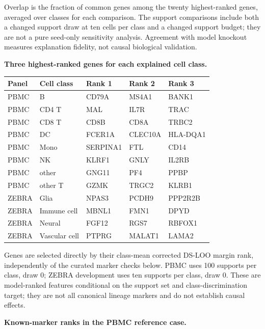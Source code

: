 Overlap is the fraction of common genes among the twenty highest-ranked genes, averaged over classes for each comparison. The support comparisons include both a changed support draw at ten cells per class and a changed support budget; they are not a pure seed-only sensitivity analysis. Agreement with model knockout measures explanation fidelity, not causal biological validation.\par\medskip\noindent\textbf{Three highest-ranked genes for each explained cell class.}\par
\nopagebreak[4]\par\noindent\begin{tabular}{@{}>{\raggedright\arraybackslash}p{2.2cm}>{\raggedright\arraybackslash}p{3.65cm}>{\raggedright\arraybackslash}p{3.0cm}>{\raggedright\arraybackslash}p{3.0cm}>{\raggedright\arraybackslash}p{3.0cm}@{}}
\toprule
Panel & Cell class & Rank 1 & Rank 2 & Rank 3 \\
\midrule
PBMC & B & CD79A & MS4A1 & BANK1 \\
PBMC & CD4 T & MAL & IL7R & TRAC \\
PBMC & CD8 T & CD8B & CD8A & TRBC2 \\
PBMC & DC & FCER1A & CLEC10A & HLA-DQA1 \\
PBMC & Mono & SERPINA1 & FTL & CD14 \\
PBMC & NK & KLRF1 & GNLY & IL2RB \\
PBMC & other & GNG11 & PF4 & PPBP \\
PBMC & other T & GZMK & TRGC2 & KLRB1 \\
ZEBRA & Glia & NPAS3 & PCDH9 & PPP2R2B \\
ZEBRA & Immune cell & MBNL1 & FMN1 & DPYD \\
ZEBRA & Neural & FGF12 & RGS7 & RBFOX1 \\
ZEBRA & Vascular cell & PTPRG & MALAT1 & LAMA2 \\
\bottomrule
\end{tabular}\par
Genes are selected directly by their class-mean corrected DS-LOO margin rank, independently of the curated marker checks below. PBMC uses 100 supports per class, draw 0; ZEBRA development uses ten supports per class, draw 0. These are model-ranked features conditional on the support set and class-discrimination target; they are not all canonical lineage markers and do not establish causal effects.\par\par\medskip\noindent\textbf{Known-marker ranks in the PBMC reference case.}\par
